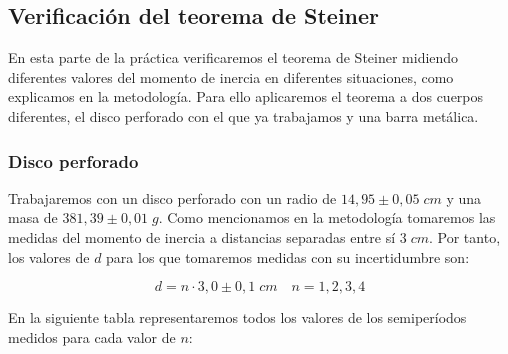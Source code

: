 \documentclass[a4paper,12pt,titlepage]{report}
\begin{document}
\subsection{Verificación del teorema de Steiner}

En esta parte de la práctica verificaremos el teorema de Steiner midiendo diferentes valores del momento de inercia en diferentes situaciones, como explicamos en la metodología. Para ello aplicaremos el teorema a dos cuerpos diferentes, el disco perforado con el que ya trabajamos y una barra metálica.

\subsubsection{Disco perforado}

Trabajaremos con un disco perforado con un radio de $14,95 \pm 0,05 \; cm$ y una masa de $381,39 \pm 0,01 \;g$. Como mencionamos en la metodología tomaremos las medidas del momento de inercia a distancias separadas entre sí $3\;cm$. Por tanto, los valores de $d$ para los que tomaremos medidas con su incertidumbre son:

\begin{equation}
    d = n\cdot 3,0 \pm 0,1 \; cm \quad n=1,2,3,4
\end{equation}

En la siguiente tabla representaremos todos los valores de los semiperíodos medidos para cada valor de $n$:
\end{document}
